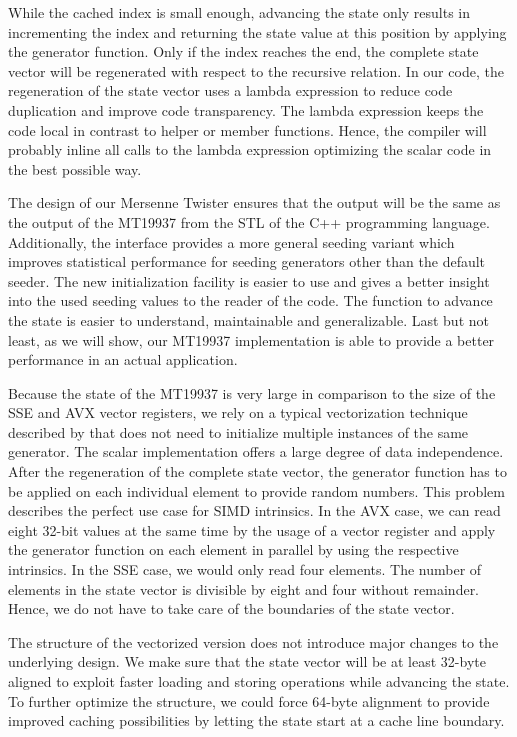 \documentclass{stdlocal}
\begin{document}
    While the cached index is small enough, advancing the state only results in incrementing the index and returning the state value at this position by applying the generator function.
    Only if the index reaches the end, the complete state vector will be regenerated with respect to the recursive relation.
    In our code, the regeneration of the state vector uses a lambda expression to reduce code duplication and improve code transparency.
    The lambda expression keeps the code local in contrast to helper or member functions.
    Hence, the compiler will probably inline all calls to the lambda expression optimizing the scalar code in the best possible way.

    The design of our Mersenne Twister ensures that the output will be the same as the output of the MT19937 from the STL of the C++ programming language.
    Additionally, the interface provides a more general seeding variant which improves statistical performance for seeding generators other than the default seeder.
    The new initialization facility is easier to use and gives a better {}insight into the used seeding values to the reader of the code.
    The function to advance the state is easier to understand, maintainable and generalizable.
    Last but not least, as we will show, our MT19937 implementation is able to provide a better performance in an actual application.

    Because the state of the MT19937 is very large in comparison to the size of the SSE and AVX vector registers, we rely on a typical vectorization technique described by \textcite{fog2015} that does not need to initialize multiple instances of the same generator.
    The scalar implementation offers a large degree of data independence.
    After the regeneration of the complete state vector, the generator function has to be applied on each individual element to provide random numbers.
    This problem describes the perfect use case for SIMD intrinsics.
    In the AVX case, we can read eight 32-bit values at the same time by the usage of a vector register and apply the generator function on each element in parallel by using the respective intrinsics.
    In the SSE case, we would only read four elements.
    The number of elements in the state vector is divisible by eight and four without remainder.
    Hence, we do not have to take care of the boundaries of the state vector.

    The structure of the vectorized version does not introduce major changes to the underlying design.
    We make sure that the state vector will be at least 32-byte aligned to exploit faster loading and storing operations while advancing the state.
    To further optimize the structure, we could force 64-byte alignment to provide improved caching possibilities by letting the state start at a cache line boundary.
\end{document}

